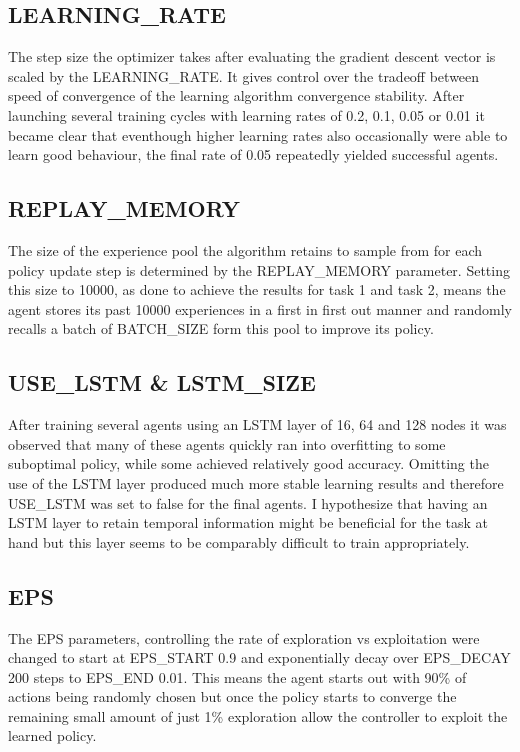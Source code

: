 \documentclass[10pt,journal,compsoc]{IEEEtran}
\begin{document}
\subsection*{LEARNING\_RATE} 
The step size the optimizer takes after evaluating the gradient descent vector is scaled by the LEARNING\_RATE. It gives control over the tradeoff between speed of convergence of the learning algorithm convergence stability. After launching several training cycles with learning rates of 0.2, 0.1, 0.05 or 0.01 it became clear that eventhough higher learning rates also occasionally were able to learn good behaviour, the final rate of 0.05 repeatedly yielded successful agents.

\subsection*{REPLAY\_MEMORY} 
The size of the experience pool the algorithm retains to sample from for each policy update step is determined by the REPLAY\_MEMORY parameter. Setting this size to 10000, as done to achieve the results for task 1 and task 2, means the agent stores its past 10000 experiences in a first in first out manner and randomly recalls a batch of BATCH\_SIZE form this pool to improve its policy.

\subsection*{USE\_LSTM \& LSTM\_SIZE} 
After training several agents using an LSTM layer of 16, 64 and 128 nodes it was observed that many of these agents quickly ran into overfitting to some suboptimal policy, while some achieved relatively good accuracy. Omitting the use of the LSTM layer produced much more stable learning results and therefore USE\_LSTM was set to false for the final agents. I hypothesize that having an LSTM layer to retain temporal information might be beneficial for the task at hand but this layer seems to be comparably difficult to train appropriately.

\subsection*{EPS} 
The EPS parameters, controlling the rate of exploration vs exploitation were changed to start at EPS\_START 0.9 and exponentially decay over EPS\_DECAY 200 steps to EPS\_END 0.01. This means the agent starts out with 90\% of actions being randomly chosen but once the policy starts to converge the remaining small amount of just 1\% exploration allow the controller to exploit the learned policy.
\end{document}

